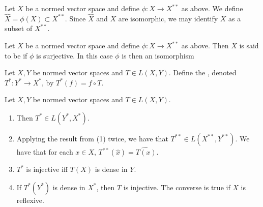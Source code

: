 \documentclass{book}
\begin{document}
	\begin{defn} \ld{}
		Let $X$ be a normed vector space and define $\phi:X \rightarrow X^{**}$ as above. We define $\widehat{X} = \phi(X) \subset X^{**}$. Since $\widehat{X}$ and $X$ are isomorphic, we may identify $X$ as a subset of $X^{**}$. 
	\end{defn}
	
	\begin{defn} \ld{}
		Let $X$ be a normed vector space and define $\phi:X \rightarrow X^{**}$ as above. Then $X$ is said to be  if $\phi$ is surjective. In this case $\phi$ is then an isomorphism
	\end{defn}

	\begin{defn}
	Let $X,Y$ be normed vector spaces and $T \in L(X,Y)$. Define the , denoted  $T^*:Y^* \rightarrow X^*$, by $T^*(f) = f \circ T$. 
	\end{defn}
	
	\begin{ex} \lex{}
		Let $X,Y$ be normed vector spaces and $T \in L(X,Y)$. 
		\begin{enumerate}
			\item Then $T^* \in L(Y^*, X^*)$.
			\item Applying the result from (1) twice, we have that $T^{**} \in L(X^{**},Y^{**})$. We have that for each $x \in X$, $T^{**}(\hat{x}) = \widehat{T(x)}$.
			\item $T^*$ is injective iff $T(X)$ is dense in $Y$.
			\item If $T^*(Y^*)$ is dense in $X^*$, then $T$ is injective. The converse is true if $X$ is reflexive.
		\end{enumerate}
	\end{ex}
	
\end{document}
